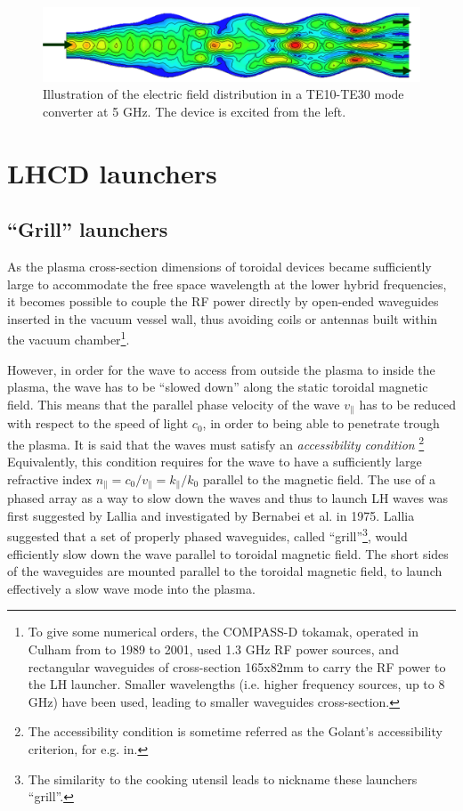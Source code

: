 \begin{figure}
\centering
\includegraphics[width=0.9\linewidth]{Figures/LHCD/ModeConverter}
\caption{Illustration of the electric field distribution in a TE10-TE30 mode converter at 5 GHz. The device is excited from the left.}
\label{fig:modeconverter}
\end{figure}


\section{LHCD launchers}
\subsection{“Grill” launchers}
As the plasma cross-section dimensions of toroidal devices became sufficiently large to accommodate the free space wavelength at the lower hybrid frequencies, it becomes possible to couple the RF power directly by open-ended waveguides inserted in the vacuum vessel wall, thus avoiding coils or antennas built within the vacuum chamber\footnote{To give some numerical orders, the COMPASS-D tokamak, operated in Culham from to 1989 to 2001, used 1.3 GHz RF power sources, and rectangular waveguides of cross-section 165x82mm to carry the RF power to the LH launcher. Smaller wavelengths (i.e. higher frequency sources, up to 8 GHz) have been used, leading to smaller waveguides cross-section.}.
 
However, in order for the wave to access from outside the plasma to inside the plasma, the wave has to be “slowed down” along the static toroidal magnetic field. This means that the parallel phase velocity of the wave $v_{\parallel}$ has to be reduced with respect to the speed of light $c_0$, in order to being able to penetrate trough the plasma. It is said that the waves must satisfy an \emph{accessibility condition} \parencite{Golant1972, Stix1992}\footnote{The accessibility condition is sometime referred as the Golant's accessibility criterion, for e.g. in\parencite{Puri1974}.} Equivalently, this condition requires for the wave to have a sufficiently large refractive index $n_{\parallel} = c_0/v_{\parallel} = k_{\parallel}/k_0$ parallel to the magnetic field. The use of a phased array as a way to slow down the waves and thus to launch LH waves was first suggested by Lallia\parencite{Lallia1975} and investigated by Bernabei et al. in 1975\parencite{Bernabei1975}. Lallia suggested that a set of properly phased waveguides, called “grill”\footnote{The similarity to the cooking utensil leads to nickname these launchers “grill”.}, would efficiently slow down the wave parallel to toroidal magnetic field. The short sides of the waveguides are mounted parallel to the toroidal magnetic field, to launch effectively a slow wave mode into the plasma. 


